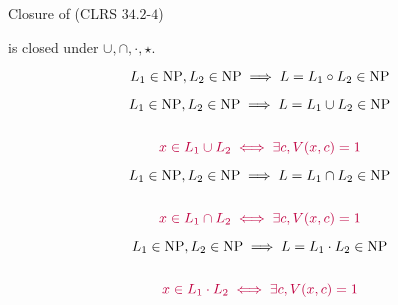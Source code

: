 
\begin{frame}
  \begin{exampleblock}{Closure of \np{} (CLRS $34.2$-$4$)}
	\begin{center}
	  \np{} is closed under $\cup, \cap, \cdot, \star$.
	\end{center}

	\[
	  L_1 \in \text{NP}, L_2 \in \text{NP} \implies L = L_1 \circ L_2 \in \text{NP}
	\]
  \end{exampleblock}
\end{frame}

\begin{frame}
  \[
	L_1 \in \text{NP}, L_2 \in \text{NP} \implies L = L_1 \cup L_2 \in \text{NP}
  \]

  \pause
  \begin{columns}
	  
  \end{columns}

  \pause
  \vspace{0.60cm}
  \[
	\textcolor{purple}{x \in L_1 \cup L_2 \iff \exists c, V(x,c) = 1}
  \]
\end{frame}

\begin{frame}
  \[
	L_1 \in \text{NP}, L_2 \in \text{NP} \implies L = L_1 \cap L_2 \in \text{NP}
  \]

  \pause
  \begin{columns}
	  
  \end{columns}

  \pause
  \vspace{0.60cm}
  \[
	\textcolor{purple}{x \in L_1 \cap L_2 \iff \exists c, V(x,c) = 1}
  \]
\end{frame}

\begin{frame}
  \[
	L_1 \in \text{NP}, L_2 \in \text{NP} \implies L = L_1 \cdot L_2 \in \text{NP}
  \]

  \pause
  \begin{columns}
	  
  \end{columns}

  \pause
  \vspace{0.60cm}
  \[
	\textcolor{purple}{x \in L_1 \cdot L_2 \iff \exists c, V(x,c) = 1}
  \]
\end{frame}

